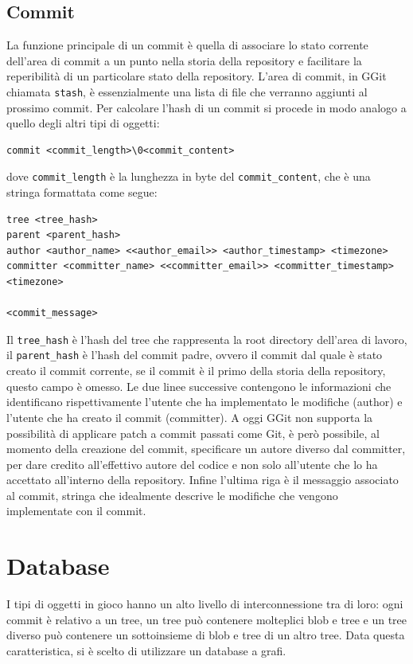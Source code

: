 \subsection{Commit}
La funzione principale di un commit è quella di associare lo stato corrente dell'area di commit a un punto nella storia della repository e facilitare la reperibilità di un particolare stato della repository.
L'area di commit, in GGit chiamata \texttt{stash}, è essenzialmente una lista di file che verranno aggiunti al prossimo commit.
Per calcolare l'hash di un commit si procede in modo analogo a quello degli altri tipi di oggetti:
\begin{verbatim}
commit <commit_length>\0<commit_content>
\end{verbatim}
dove \texttt{commit\_length} è la lunghezza in byte del \texttt{commit\_content}, che è una stringa formattata come segue:
\begin{verbatim}
tree <tree_hash>
parent <parent_hash>
author <author_name> <<author_email>> <author_timestamp> <timezone>
committer <committer_name> <<committer_email>> <committer_timestamp> <timezone>

<commit_message>
\end{verbatim}
Il \texttt{tree\_hash} è l'hash del tree che rappresenta la root directory dell'area di lavoro, il \texttt{parent\_hash} è l'hash del commit padre, ovvero il commit dal quale è stato creato il commit corrente, se il commit è il primo della storia della repository, questo campo è omesso.
Le due linee successive contengono le informazioni che identificano rispettivamente l'utente che ha implementato le modifiche (author) e l'utente che ha creato il commit (committer). A oggi GGit non supporta la possibilità di applicare patch a commit passati come Git\cite{gitdocsauthcomm}, è però possibile, al momento della creazione del commit, specificare un autore diverso dal committer, per dare credito all'effettivo autore del codice e non solo all'utente che lo ha accettato all'interno della repository.
Infine l'ultima riga è il messaggio associato al commit, stringa che idealmente descrive le modifiche che vengono implementate con il commit.
\section{Database}
\label{sec:database}
I tipi di oggetti in gioco hanno un alto livello di interconnessione tra di loro: ogni commit è relativo a un tree, un tree può contenere molteplici blob e tree e un tree diverso può contenere un sottoinsieme di blob e tree di un altro tree. Data questa caratteristica, si è scelto di utilizzare un database a grafi.

